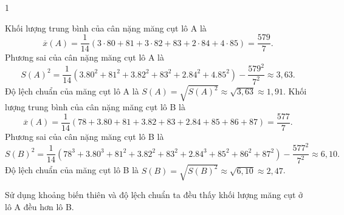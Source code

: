 \begin{bt}
{\begin{enumEX}[a)]{1}
			\item Khối lượng trung bình của cân nặng măng cụt lô A là
			$$\overline{x}(A)=\dfrac{1}{14}(3 \cdot 80+81+3 \cdot 82+83+2 \cdot 84+4 \cdot 85)=\dfrac{579}{7}.$$
			Phương sai của cân nặng măng cụt lô A là
			$$
			S(A)^{2}=\dfrac{1}{14}\left(3.80^{2}+81^{2}+3.82^{2}+83^{2}+2.84^{2}+4.85^{2}\right)-\dfrac{579^{2}}{7^{2}} \approx 3{,}63.
			$$
			Độ lệch chuẩn của măng cụt lô A là $S(A)=\sqrt{S(A)^{2}} \approx \sqrt{3{,}63} \approx 1{,}91$.
			Khối lượng trung bình của cân nặng măng cụt lô B là
			$$
			\overline{x}(A)=\dfrac{1}{14}(78+3.80+81+3.82+83+2.84+85+86+87)=\dfrac{577}{7}.
			$$
			Phương sai của cân nặng măng cụt lô B là
			$$
			S(B)^{2} =\dfrac{1}{14}\left(78^{3}+3.80^{3}+81^{2}+3.82^{2}+83^{2}+2.84^{3}+85^{2}+86^{2}+87^{2}\right)-\dfrac{577^{2}}{7^{2}}  \approx 6{,}10.
			$$
			Độ lệch chuẩn của măng cụt lô B là $S(B)=\sqrt{S(B)^{2}} \approx \sqrt{6{,}10} \approx 2{,}47$.
			\item Sử dụng khoảng biến thiên và độ lệch chuẩn ta đều thấy khối lượng măng cụt ở lô A đều hơn lô B.
		\end{enumEX}
	}
\end{bt}

